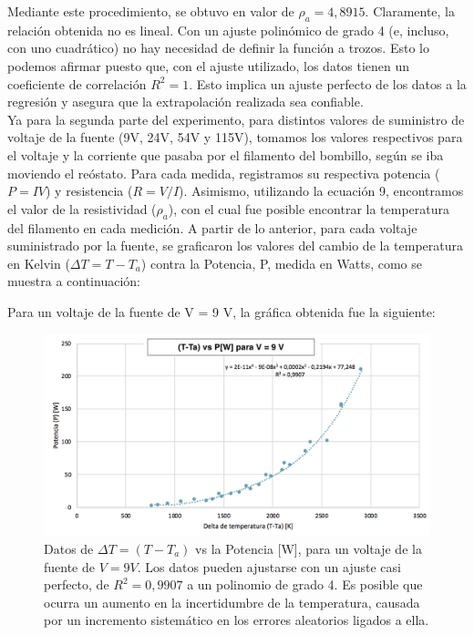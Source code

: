 \documentclass[%
 reprint,
 amsmath,amssymb,
 aps,
]{revtex4-1}
\begin{document}
Mediante este procedimiento, se obtuvo en valor de $\rho_{a} = 4,8915$. Claramente, la relación obtenida no es lineal. Con un ajuste polinómico de grado 4 (e, incluso, con uno cuadrático) no hay necesidad de definir la función a trozos. Esto lo podemos afirmar puesto que, con el ajuste utilizado, los datos tienen un coeficiente de correlación $R^2 = 1$. Esto implica un ajuste perfecto de los datos a la regresión y asegura que la extrapolación realizada sea confiable. \\

Ya para la segunda parte del experimento, para distintos valores de suministro de voltaje de la fuente (9V, 24V, 54V y 115V), tomamos los valores respectivos para el voltaje y la corriente que pasaba por el filamento del bombillo, según se iba moviendo el reóstato. Para cada medida, registramos su respectiva potencia ($P = IV$) y resistencia ($R = V/I$). Asimismo, utilizando la ecuación 9, encontramos el valor de la resistividad ($\rho_{a}$), con el cual fue posible encontrar la temperatura del filamento en cada medición. A partir de lo anterior, para cada voltaje suministrado por la fuente, se graficaron los valores del cambio de la temperatura en Kelvin ($\Delta T = T - T_{a}$) contra la Potencia, P, medida en Watts, como se muestra a continuación:

Para un voltaje de la fuente de V = 9 V, la gráfica obtenida fue la siguiente: 
\begin{figure}[H]
    \centering
    \includegraphics[scale= 0.3]{graf1.png}
    \caption{Datos de $\Delta T = (T - T_{a})$ vs la Potencia [W], para un voltaje de la fuente de $V = 9 V$. Los datos pueden ajustarse con un ajuste casi perfecto, de $R^2 = 0,9907$ a un polinomio de grado 4. Es posible que ocurra un aumento en la incertidumbre de la temperatura, causada por un incremento sistemático en los errores aleatorios ligados a ella.
}
    \label{fig:Figura 5}
\end{figure}
\end{document}
